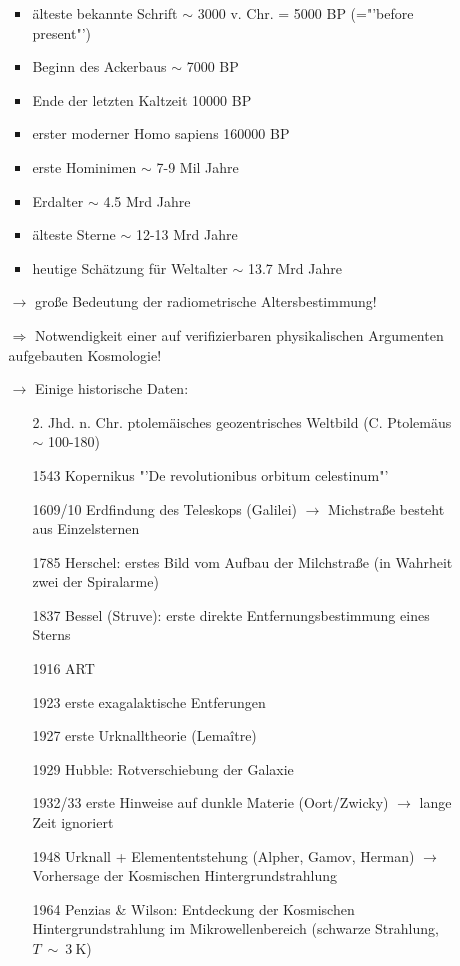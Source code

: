 \begin{itemize}
\begin{itemize}
\begin{itemize}
					\item älteste bekannte Schrift $\sim$ 3000 v. Chr. = 5000 BP (="'before present"')
					\item Beginn des Ackerbaus $\sim$ 7000 BP
					\item Ende der letzten Kaltzeit 10000 BP
					\item erster moderner Homo sapiens 160000 BP
					\item erste Hominimen $\sim $ 7-9 Mil Jahre
					\item Erdalter $\sim $ 4.5 Mrd Jahre
					\item älteste Sterne $\sim $ 12-13 Mrd Jahre
					\item heutige Schätzung für Weltalter $\sim $ 13.7 Mrd Jahre
				\end{itemize}
			\item[$\to$] große Bedeutung der radiometrische Altersbestimmung!
			\item[$\Rightarrow$] Notwendigkeit einer auf verifizierbaren physikalischen Argumenten aufgebauten Kosmologie!
			\item[$\to$] Einige historische Daten:
				\begin{itemize}
					\item[2. Jhd. n. Chr.] ptolemäisches geozentrisches Weltbild (C. Ptolemäus $\sim$ 100-180)
					\item[1543] Kopernikus "'De revolutionibus orbitum celestinum"'
					\item[1609/10] Erdfindung des Teleskops (Galilei) $\to$ Michstraße besteht aus Einzelsternen
					\item[1785] Herschel: erstes Bild vom Aufbau der Milchstraße (in Wahrheit zwei der Spiralarme)
					\item[1837] Bessel (Struve): erste direkte Entfernungsbestimmung eines Sterns
					\item[1916] ART
					\item[1923] erste exagalaktische Entferungen
					\item[1927] erste Urknalltheorie (Lemaître)
					\item[1929] Hubble: Rotverschiebung der Galaxie
					\item[1932/33] erste Hinweise auf dunkle Materie (Oort/Zwicky) $\to$ lange Zeit ignoriert
					\item[1948] Urknall + Elemententstehung (Alpher, Gamov, Herman) $\to$ Vorhersage der Kosmischen Hintergrundstrahlung
					\item[1964] Penzias \& Wilson: Entdeckung der Kosmischen Hintergrundstrahlung im Mikrowellenbereich (schwarze Strahlung, $T\ \sim \ \SI{3}{\K}$)

\end{itemize}
\end{itemize}
\end{itemize}
